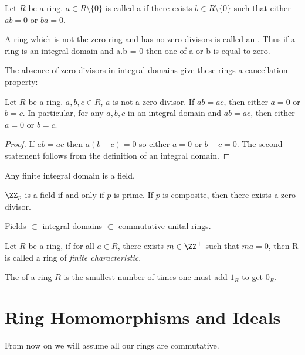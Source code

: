 \begin{definition}
Let $R$ be a ring. $a\in R\setminus\{0\}$ is called a  if there exists $b\in R\setminus\{0\}$ such that either $ab=0$ or $ba=0$.

A ring which is not the zero ring and has no zero divisors is called an . Thus if a ring is an integral domain and a.b = 0 then one of a or b is equal to zero.
\end{definition}

The absence of zero divisors in integral domains give these rings a cancellation property:

\begin{proposition}
Let $R$ be a ring. $a,b,c\in R$, $a$ is not a zero divisor. If $ab=ac$, then either $a=0$ or $b=c$. In particular, for any $a,b,c$ in an integral domain and $ab=ac$, then either $a=0$ or $b=c$.
\end{proposition}

\begin{proof}
If $ab=ac$ then $a(b-c)=0$ so either $a=0$ or $b-c=0$. The second statement follows from the definition of an integral domain.
\end{proof}

\begin{corollary}
Any finite integral domain is a field.
\end{corollary}

\begin{proposition}
$\ZZ_p$ is a field if and only if $p$ is prime. If $p$ is composite, then there exists a zero divisor.
\end{proposition}

\begin{remark}
Fields $\subset$ integral domains $\subset$ commutative unital rings.
\end{remark}

\begin{definition}
Let $R$ be a ring, if for all $a\in R$, there exists $m\in\ZZ^+$ such that $ma=0$, then R is called a ring of \emph{finite characteristic}.
\end{definition}

\begin{definition}[Characterisitc]
The  of a ring $R$ is the smallest number of times one must add $1_R$ to get $0_R$.
\end{definition}

\section{Ring Homomorphisms and Ideals}
From now on we will assume all our rings are commutative.

